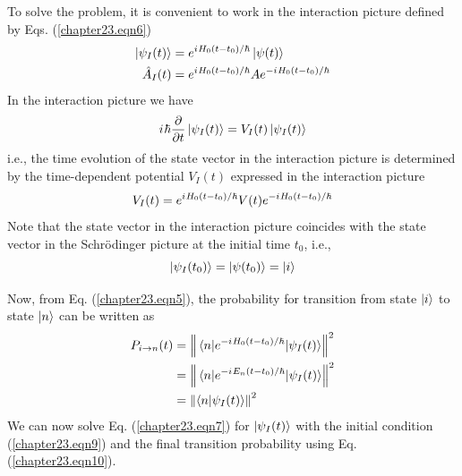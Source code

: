 To solve the problem, it is convenient to work in the interaction picture defined by Eqs. (\ref{chapter23.eqn6})
\begin{align}
\label{chapter23.eqn6}
\begin{split}
\ket{\psi_I(t)} &= e^{{i\mkern1mu} H_0 (t-t_0)/\hbar} \ket{\psi(t)} \\
\hat{A}_I(t) &= e^{{i\mkern1mu} H_0 (t-t_0)/\hbar} A e^{-{i\mkern1mu} H_0 (t-t_0)/\hbar}
\end{split}
\end{align}
In the interaction picture we have
\begin{equation}
\label{chapter23.eqn7}
{i\mkern1mu} \hbar \pdv{}{t} \ket{\psi_I(t)} = V_I(t) \ket{\psi_I(t)}
\end{equation}
i.e., the time evolution of the state vector in the interaction picture is determined by the time-dependent potential $V_I(t)$ expressed in the interaction picture
\begin{equation}
\label{chapter23.eqn8}
	V_I(t) = e^{{i\mkern1mu} H_0 (t-t_0)/\hbar} V(t) e^{-{i\mkern1mu} H_0 (t-t_0)/\hbar}
\end{equation}
Note that the state vector in the interaction picture coincides with the state vector in the Schr\"{o}dinger picture at the initial time $t_0$, i.e.,
\begin{equation}
\label{chapter23.eqn9}
\ket{\psi_I(t_0)} = \ket{\psi(t_0)} = \ket{i}
\end{equation}

Now, from Eq. (\ref{chapter23.eqn5}), the probability for transition from state $\ket{i}$ to state $\ket{n}$ can be written as
\begin{align}
P_{i\rightarrow n}(t) 
&= \norm{\mel{n}{e^{-{i\mkern1mu}H_0(t - t_0)/\hbar}}{\psi_I(t)}}^2 \nonumber \\
&= \norm{\mel{n}{e^{-{i\mkern1mu}E_n(t - t_0)/\hbar}}{\psi_I(t)}}^2 \nonumber \\
&= \norm{\braket{n}{\psi_I(t)}}^2
\label{chapter23.eqn10}
\end{align}
We can now solve Eq. (\ref{chapter23.eqn7}) for $\ket{\psi_I(t)}$ with the initial condition (\ref{chapter23.eqn9}) and the final transition probability using Eq. (\ref{chapter23.eqn10}).


